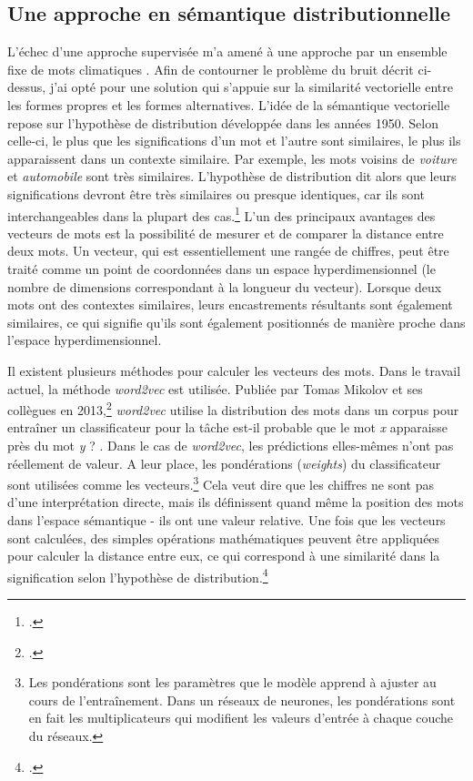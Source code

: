 \documentclass[a4paper,twoside,12pt]{article}
\begin{document}
\subsection{Une approche en sémantique distributionnelle} \label{distributional_semantics_approach}

L'échec d'une approche supervisée m'a amené à une approche par un ensemble fixe de mots \og climatiques \fg{}. Afin de contourner le problème du bruit décrit ci-dessus, j'ai opté pour une solution qui s'appuie sur la similarité vectorielle entre les formes \og propres \fg{} et les formes alternatives. L'idée de la sémantique vectorielle repose sur l'hypothèse de distribution développée dans les années 1950. Selon celle-ci, le plus que les significations d'un mot et l'autre sont similaires, le plus ils apparaissent dans un contexte similaire. Par exemple, les mots voisins de \textit{voiture} et \textit{automobile} sont très similaires. L'hypothèse de distribution dit alors que leurs significations devront être très similaires ou presque identiques, car ils sont interchangeables dans la plupart des cas.\footcite[96]{jurafsky_speech_2020} L'un des principaux avantages des vecteurs de mots est la possibilité de mesurer et de comparer la \og distance \fg{} entre deux mots. Un vecteur, qui est essentiellement une rangée de chiffres, peut être traité comme un point de coordonnées dans un espace hyperdimensionnel (le nombre de dimensions correspondant à la longueur du vecteur). Lorsque deux mots ont des contextes similaires, leurs encastrements résultants sont également similaires, ce qui signifie qu'ils sont également positionnés de manière proche dans l'espace hyperdimensionnel.

Il existent plusieurs méthodes pour calculer les vecteurs des mots. Dans le travail actuel, la méthode \textit{word2vec} est utilisée. Publiée par Tomas Mikolov et ses collègues en 2013,\footcite{mikolov_distributed_2013} \textit{word2vec} utilise la distribution des mots dans un corpus pour entraîner un classificateur pour la tâche \og est-il probable que le mot \textit{x} apparaisse près du mot \textit{y} ? \fg{}. Dans le cas de \textit{word2vec}, les prédictions elles-mêmes n'ont pas réellement de valeur. A leur place, les pondérations (\textit{weights}) du classificateur sont utilisées comme les vecteurs.\footnote{Les pondérations sont les paramètres que le modèle apprend à ajuster au cours de l'entraînement. Dans un réseaux de neurones, les pondérations sont en fait les multiplicateurs qui modifient les valeurs d'entrée à chaque couche du réseaux.} Cela veut dire que les chiffres ne sont pas d'une interprétation directe, mais ils définissent quand même la position des mots dans l'espace sémantique - ils ont une valeur relative. Une fois que les vecteurs sont calculées, des simples opérations mathématiques peuvent être appliquées pour calculer la distance entre eux, ce qui correspond à une similarité dans la signification selon l'hypothèse de distribution.\footcite[112-113]{jurafsky_speech_2020}
\end{document}

